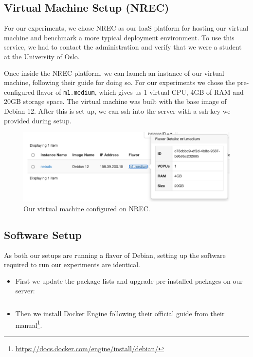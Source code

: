 \documentclass[
  table]{report}
\providecommand{\tightlist}{%
  \setlength{\itemsep}{0pt}\setlength{\parskip}{0pt}}
\begin{document}
\subsection{Virtual Machine Setup (\ac{NREC})}

For our experiments, we chose \ac{NREC} as our \ac{IaaS} platform for
hosting our virtual machine and benchmark a more typical deployment
environment. To use this service, we had to contact the administration
and verify that we were a student at the University of Oslo.

Once inside the \ac{NREC} platform, we can launch an instance of our
virtual machine, following their guide for doing so. For our experiments
we chose the pre-configured flavor of \texttt{m1.medium}, which gives us
1 virtual CPU, 4GB of RAM and 20GB storage space. The virtual machine
was built with the base image of Debian 12. After this is set up, we can
ssh into the server with a ssh-key we provided during setup.

\begin{figure}[H]
\centering
  \includegraphics{assets/6-nrec_nebula}
  \caption{Our virtual machine configured on \ac{NREC}.}
  \label{fig:nrec_nebula}
\end{figure}

\subsection{Software Setup}

As both our setups are running a flavor of Debian, setting up the
software required to run our experiments are identical.

\begin{itemize}
\tightlist
\item
  First we update the package lists and upgrade pre-installed packages
  on our server:
\end{itemize}

\inputminted[firstline=12, lastline=13]{shell}{assets/code/commands.sh}

\begin{itemize}
\tightlist
\item
  Then we install Docker Engine following their official guide from
  their manual\footnote{\url{https://docs.docker.com/engine/install/debian/}}.
\end{itemize}
\end{document}
